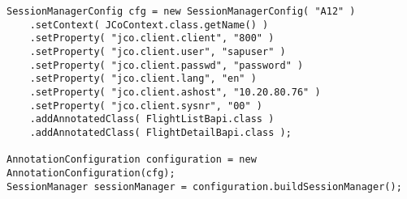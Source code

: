 \begin{lstlisting}[caption=Programmatic configuration]
SessionManagerConfig cfg = new SessionManagerConfig( "A12" )
    .setContext( JCoContext.class.getName() )
    .setProperty( "jco.client.client", "800" )
    .setProperty( "jco.client.user", "sapuser" )
    .setProperty( "jco.client.passwd", "password" )
    .setProperty( "jco.client.lang", "en" )
    .setProperty( "jco.client.ashost", "10.20.80.76" )
    .setProperty( "jco.client.sysnr", "00" )
    .addAnnotatedClass( FlightListBapi.class )
    .addAnnotatedClass( FlightDetailBapi.class );

AnnotationConfiguration configuration = new AnnotationConfiguration(cfg);
SessionManager sessionManager = configuration.buildSessionManager();
\end{lstlisting}








